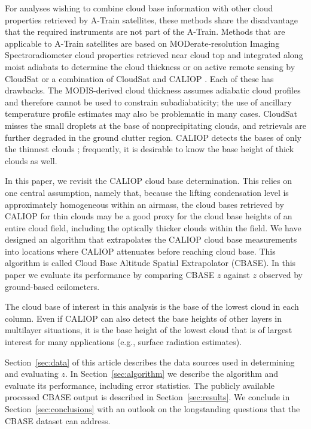 \documentclass[essd,manuscript]{copernicus}\usepackage[]{graphicx}\usepackage[]{color}
\newcommand\CBH{\ensuremath{z}}
\begin{document}
For analyses wishing to combine cloud base information with other cloud
properties retrieved by A-Train satellites, these methods share the disadvantage
that the required instruments are not part of the A-Train.  Methods that are
applicable to A-Train satellites are based on MODerate-resolution Imaging
Spectroradiometer \citep[MODIS,][]{Platnick2017} cloud properties retrieved near
cloud top and integrated along moist adiabats to determine the cloud thickness
\citep{Meerkoetter2007} or on active remote sensing by CloudSat
\citep[2B-GEOPROF,][]{Marchand2008} or a combination of CloudSat and CALIOP
\citep[2B-GEOPROF-LIDAR,][]{Mace2014}.  Each of these has drawbacks.  The
MODIS-derived cloud thickness assumes adiabatic cloud profiles and therefore
cannot be used to constrain subadiabaticity; the use of ancillary temperature
profile estimates may also be problematic in many cases.  CloudSat misses the
small droplets at the base of nonprecipitating clouds, and retrievals are
further degraded in the ground clutter region.  CALIOP detects the bases of only
the thinnest clouds \citep[$\tau < 5$,][]{Mace2014}; frequently, it is desirable
to know the base height of thick clouds as well.

In this paper, we revisit the CALIOP cloud base determination.  This relies on
one central assumption, namely that, because the lifting condensation level is
approximately homogeneous within an airmass, the cloud bases retrieved by CALIOP
for thin clouds may be a good proxy for the cloud base heights of an entire
cloud field, including the optically thicker clouds within the field.  We have
designed an algorithm that extrapolates the CALIOP cloud base measurements into
locations where CALIOP attenuates before reaching cloud base.  This algorithm is
called Cloud Base Altitude Spatial Extrapolator (CBASE).  In this paper we
evaluate its performance by comparing CBASE \CBH{} against \CBH{} observed by
ground-based ceilometers.

The cloud base of interest in this analysis is the base of the lowest cloud in
each column. Even if CALIOP can also detect the base heights of other layers
in multilayer situations, it is the base height of the lowest cloud that is of
largest interest for many applications (e.g., surface radiation
estimates). 

Section~\ref{sec:data} of this article describes the data sources used in
determining and evaluating \CBH{}.  In Section~\ref{sec:algorithm} we describe
the algorithm and evaluate its performance, including error statistics.  The
publicly available processed CBASE output is described in
Section~\ref{sec:results}.  We conclude in Section~\ref{sec:conclusions} with an
outlook on the longstanding questions that the CBASE dataset can address.
\end{document}
